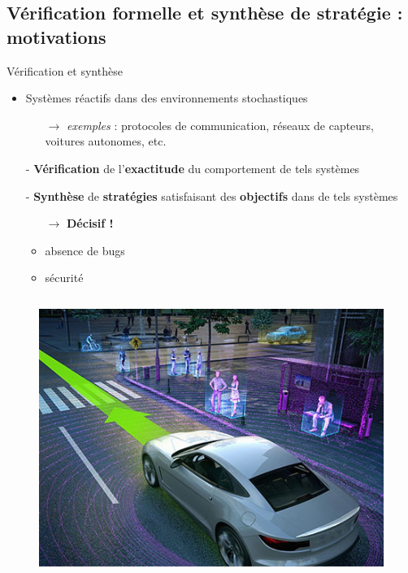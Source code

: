 \documentclass[compress]{beamer}
\theoremstyle{theorem}%
\begin{document}
\subsection{Vérification formelle et synthèse de stratégie : motivations}
\begin{frame}{Vérification et synthèse}\footnotesize
  \begin{itemize}
    \item Systèmes réactifs dans des environnements stochastiques
    \begin{itemize}
      \footnotesize
      \item[$\rightarrow$] \textit{exemples} : protocoles de communication, réseaux de capteurs, voitures autonomes, etc.
    \end{itemize}
    \item[-] \textbf{\color{fibeamer@orange}Vérification} de l'\textbf{\color{fibeamer@orange}exactitude} du comportement de tels systèmes \item[-]\textbf{\color{orange}Synthèse} de \textbf{\color{orange}stratégies} satisfaisant des \textbf{\color{orange}objectifs} dans de tels systèmes
    \begin{itemize}
      \footnotesize
      \item[$\rightarrow$] \alert{\textbf{Décisif !}}
      \item absence de bugs
      \item \alert{sécurité}
    \end{itemize}
  \end{itemize}
  \begin{center}
  \vspace{-.03\linewidth}
  \begin{columns}
    \begin{column}{0.5\linewidth}
    \begin{figure}
      \centering
      \includegraphics[width=0.7\linewidth]{resources/autonomous-cars}

\end{figure}
\end{column}
\end{columns}
\end{center}
\end{frame}
\end{document}
